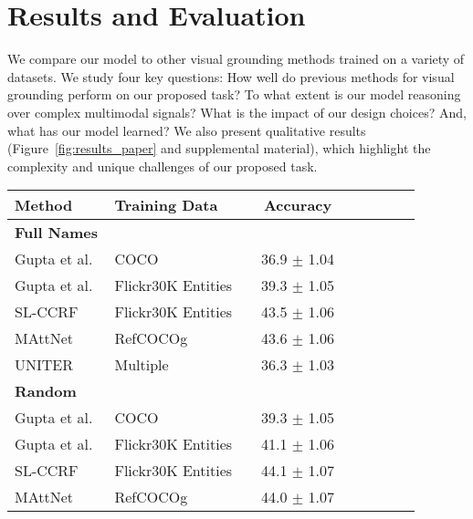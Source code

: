 \section{Results and Evaluation}\label{sec:results}

We compare our model
to other visual grounding methods trained on a variety of datasets. We study four key questions: How well do previous methods for visual grounding perform on our proposed task? To what extent is our model reasoning over complex multimodal signals? What is the impact of our design choices? And, what has our model learned?  
We also present qualitative results (Figure~\ref{fig:results_paper} and supplemental material), which  highlight the complexity and unique challenges of our proposed task.

\begin{table}[t]
  \centering
  \setlength{\tabcolsep}{3.2pt}
  \def\arraystretch{0.95}
  \begin{tabularx}{1.0\columnwidth}{lllcccccc}
    \toprule
    Method                                   & Training Data      &   & Accuracy    \\
    \midrule
    \textbf{Full Names} \\
    Gupta et al.~\cite{gupta2020contrastive} & COCO               &   & 36.9 $\pm$ 1.04          \\
    Gupta et al.~\cite{gupta2020contrastive} & Flickr30K Entities &   & 39.3 $\pm$ 1.05          \\
    SL-CCRF~\cite{liu2020phrase}             & Flickr30K Entities &   &  43.5 $\pm$ 1.06         \\
    MAttNet~\cite{yu2018mattnet}             & RefCOCOg           &   &  43.6 $\pm$ 1.06         \\
    UNITER~\cite{chen2020uniter}             & Multiple~\cite{lin2014microsoft,krishna2017visual,ordonez2011im2text,sharma2018conceptual}  &   &  36.3 $\pm$ 1.03            \\
    \midrule
    \textbf{Random} \\
    Gupta et al.~\cite{gupta2020contrastive} & COCO               &   &  39.3 $\pm$ 1.05         \\
    Gupta et al.~\cite{gupta2020contrastive} & Flickr30K Entities &   &  41.1 $\pm$ 1.06          \\
    SL-CCRF~\cite{liu2020phrase}             & Flickr30K Entities &   & 44.1 $\pm$ 1.07          \\
    MAttNet~\cite{yu2018mattnet}             & RefCOCOg           &   &  44.0 $\pm$ 1.07          \\

\end{tabularx}
\end{table}
